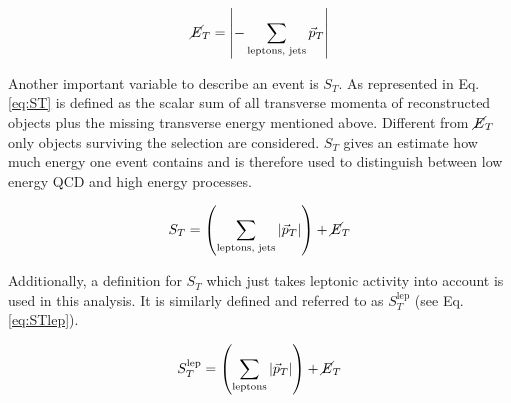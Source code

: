 	\begin{equation}
		\cancel{E}_T = \left| - \sum_{\textrm{leptons, jets}}^{} \vec{p}_T \right|
		\label{eq:MET}
	\end{equation}
	
	\noindent Another important variable to describe an event is $S_T$. As represented in Eq. \ref{eq:ST} is defined as the scalar sum of all transverse momenta of reconstructed objects plus the missing transverse energy mentioned above. Different from $\cancel{E}_T$ only objects surviving the selection are considered. $S_T$ gives an estimate how much energy one event contains and is therefore used to distinguish between low energy QCD and high energy processes. 
	
	\begin{equation}
		S_T = \left( \sum_{\textrm{leptons, jets}}^{} \vert \vec{p}_T \vert \right) + \cancel{E}_T
		\label{eq:ST}
	\end{equation}
	
	\noindent Additionally, a definition for $S_T$ which just takes leptonic activity into account is used in this analysis. It is similarly defined and referred to as $S_T^{\text{lep}}$ (see Eq. \ref{eq:STlep}).
	
	\begin{equation}
		S_T^\text{lep} = \left( \sum_{\textrm{leptons}}^{} \vert \vec{p}_T \vert \right) + \cancel{E}_T
		\label{eq:STlep}
	\end{equation}	
